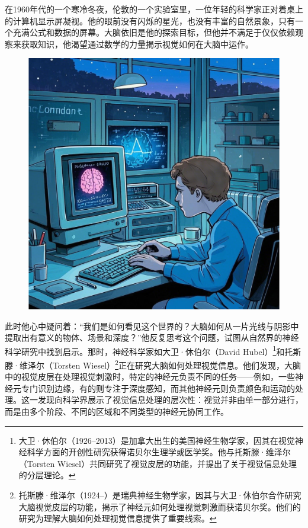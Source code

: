 在1960年代的一个寒冷冬夜，伦敦的一个实验室里，一位年轻的科学家正对着桌上的计算机显示屏凝视。他的眼前没有闪烁的星光，也没有丰富的自然景象，只有一个充满公式和数据的屏幕。大脑依旧是他的探索目标，但他并不满足于仅仅依赖观察来获取知识，他渴望通过数学的力量揭示视觉如何在大脑中运作。
\begin{figure}[htb]
	\centering
	\includegraphics[width=\linewidth]{image/3/3.1.1.png}
\end{figure}

此时他心中疑问着：“我们是如何看见这个世界的？大脑如何从一片光线与阴影中提取出有意义的物体、场景和深度？”他反复思考这个问题，试图从自然界的神经科学研究中找到启示。那时，神经科学家如大卫·休伯尔（David Hubel）\footnote{大卫·休伯尔（1926--2013）是加拿大出生的美国神经生物学家，因其在视觉神经科学方面的开创性研究获得诺贝尔生理学或医学奖。他与托斯滕·维泽尔（Torsten Wiesel）共同研究了视觉皮层的功能，并提出了关于视觉信息处理的分层理论。}和托斯滕·维泽尔（Torsten Wiesel）\footnote{托斯滕·维泽尔（1924--）是瑞典神经生物学家，因其与大卫·休伯尔合作研究大脑视觉皮层的功能，揭示了神经元如何处理视觉刺激而获诺贝尔奖。他们的研究为理解大脑如何处理视觉信息提供了重要线索。}正在研究大脑如何处理视觉信息。他们发现，大脑中的视觉皮层在处理视觉刺激时，特定的神经元负责不同的任务——例如，一些神经元专门识别边缘，有的则专注于深度感知，而其他神经元则负责颜色和运动的处理。这一发现向科学界展示了视觉信息处理的层次性：视觉并非由单一部分进行，而是由多个阶段、不同的区域和不同类型的神经元协同工作。

